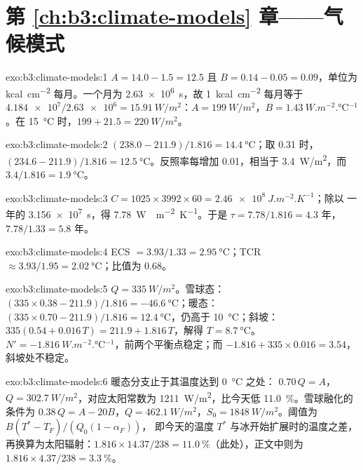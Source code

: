 \section*{第 \ref{ch:b3:climate-models} 章——气候模式}

\begin{solution}{exo:b3:climate-models:1}
$A = 14.0 - 1.5 = \num{12.5}$ 且 $B = 0.14 - 0.05 = \num{0.09}$，单位为
\unit{kcal.cm^{-2}} 每月。一个月为 \qty{2.63e6}{s}，故
\qty{1}{kcal.cm^{-2}} 每月等于 $\num{4.184e7}/\num{2.63e6} =
\qty{15.91}{W/m^2}$：$A = \qty{199}{W/m^2}$，$B =
\qty{1.43}{W.m^{-2}.\celsius^{-1}}$。在 \qty{15}{\celsius} 时，$199 + 21.5 =
\qty{220}{W/m^2}$。
\end{solution}

\begin{solution}{exo:b3:climate-models:2}
$(238.0 - 211.9)/1.816 = \qty{14.4}{\celsius}$；取 0.31 时，$(234.6 -
211.9)/1.816 = \qty{12.5}{\celsius}$。反照率每增加 0.01，相当于
\qty{3.4}{W/m^2}，而 $3.4/1.816 = \qty{1.9}{\celsius}$。
\end{solution}

\begin{solution}{exo:b3:climate-models:3}
$C = 1025\times3992\times60 = \qty{2.46e8}{J.m^{-2}.K^{-1}}$；除以
一年的 \qty{3.156e7}{s}，得 \qty{7.78}{W..m^{-2}.K^{-1}}。于是 $\tau
= 7.78/1.816 = \num{4.3}\text{ 年}$，$7.78/1.33 = \num{5.8}\text{ 年}$。
\end{solution}

\begin{solution}{exo:b3:climate-models:4}
ECS $= 3.93/1.33 = \qty{2.95}{\celsius}$；TCR $\approx 3.93/1.95 =
\qty{2.02}{\celsius}$；比值为 \num{0.68}。
\end{solution}

\begin{solution}{exo:b3:climate-models:5}
$Q = \qty{335}{W/m^2}$。雪球态：$(335\times0.38 - 211.9)/1.816 =
\qty{-46.6}{\celsius}$；暖态：$(335\times0.70 - 211.9)/1.816 =
\qty{12.4}{\celsius}$，仍高于 \qty{10}{\celsius}；斜坡：$335(0.54 +
0.016\,T) = 211.9 + 1.816\,T$，解得 $T = \qty{8.7}{\celsius}$。$N' =
\qty{-1.816}{W.m^{-2}.\celsius^{-1}}$，前两个平衡点稳定；而 $-1.816
+ 335\times0.016 = \num{+3.54}$，斜坡处不稳定。
\end{solution}

\begin{solution}{exo:b3:climate-models:6}
暖态分支止于其温度达到 \qty{0}{\celsius} 之处：
$0.70\,Q = A$，$Q = \qty{302.7}{W/m^2}$，对应太阳常数为
\qty{1211}{W/m^2}，比今天低 \qty{11.0}{\percent}。雪球融化的条件为
$0.38\,Q = A - 20B$，$Q = \qty{462.1}{W/m^2}$，$S_0 =
\qty{1848}{W/m^2}$。阈值为 $B(T^* - T_F)/(Q_0(1 - \alpha_F))$，
即今天的温度 $T^*$ 与冰开始扩展时的温度之差，
再换算为太阳辐射：$1.816\times14.37/238 =
\qty{11.0}{\percent}$（此处），正文中则为
$1.816\times4.37/238 = \qty{3.3}{\percent}$。
\end{solution}

